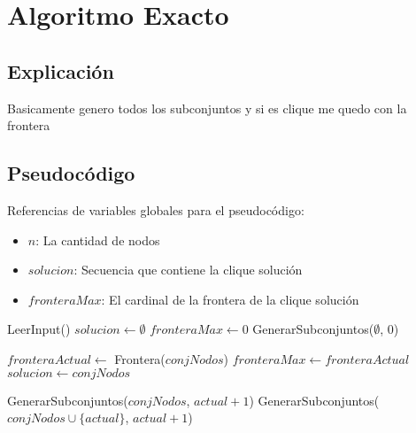 \section{Algoritmo Exacto}

\subsection{Explicación}
Basicamente genero todos los subconjuntos y si es clique me quedo con la frontera

\subsection{Pseudocódigo}

Referencias de variables globales para el pseudocódigo:
\begin{itemize}
    \item $n$: La cantidad de nodos
    \item $solucion$: Secuencia que contiene la clique solución
    \item $fronteraMax$: El cardinal de la frontera de la clique solución
\end{itemize}

\begin{algorithm}[H]
\begin{algorithmic}
    \State LeerInput()
    \State $solucion \gets \emptyset$
    \State $fronteraMax \gets 0$
    \State GenerarSubconjuntos($\emptyset$, $0$)
\EndFunction
\end{algorithmic}
\end{algorithm}

\begin{algorithm}[H]
\begin{algorithmic}

            \State $fronteraActual \gets$ Frontera($conjNodos$)
                \State $fronteraMax \gets fronteraActual$
                \State $solucion \gets conjNodos$
            \EndIf
        \EndIf

    \Else
        \State GenerarSubconjuntos($conjNodos$, $actual + 1$)
        \State GenerarSubconjuntos($conjNodos \cup \{actual\}$, $actual + 1$)
    \EndIf
\EndFunction
\end{algorithmic}
\end{algorithm}

